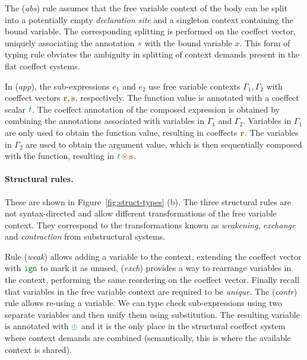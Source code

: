The (\emph{abs}) rule assumes that the free variable context of the body can be split into
a potentially empty \emph{declaration site} and a singleton context containing the bound
variable. The corresponding splitting is performed on the coeffect vector, uniquely associating
the annotation $\cclrd{s}$ with the bound variable $x$. This form of typing rule obviates the
ambiguity in splitting of context demands present in the flat coeffect systems.

In (\emph{app}), the sub-expressions $e_1$ and $e_2$ use free variable contexts $\Gamma_1, \Gamma_2$
with coeffect vectors $\aclrd{\textbf{r}}, \aclrd{\textbf{s}}$, respectively. The function
value is annotated with a coeffect scalar $\cclrd{t}$.
The coeffect annotation of the composed expression is obtained by combining the annotations
associated with variables in $\Gamma_1$ and $\Gamma_2$. Variables in $\Gamma_1$ are only
used to obtain the function value, resulting in coeffects $\aclrd{\textbf{r}}$. The
variables in $\Gamma_2$ are used to obtain the argument value, which is then sequentially
composed with the function, resulting in $\cclrd{t}\,\aseq\,\aclrd{\textbf{s}}$.

\paragraph{Structural rules.}
These are shown in Figure~\ref{fig:struct-types} (b). The three structural rules are not
syntax-directed and allow different transformations of the free variable context. They correspond
to the transformations known as \emph{weakening}, \emph{exchange} and \emph{contraction}
from substructural systems.

Rule (\emph{weak}) allows adding a variable to the context, extending the coeffect
vector with $\czero$ to mark it as unused, (\emph{exch}) provides a way to rearrange variables
in the context, performing the same reordering on the coeffect vector. Finally recall that
variables in the free variable context are required to be \emph{unique}. The (\emph{contr}) rule
allows re-using a variable. We can type check sub-expressions using two separate variables and
then unify them using substitution. The resulting variable is annotated with $\cpar$ and it
is the only place in the structural coeffect system where context demands are combined
(semantically, this is where the available context is shared).


